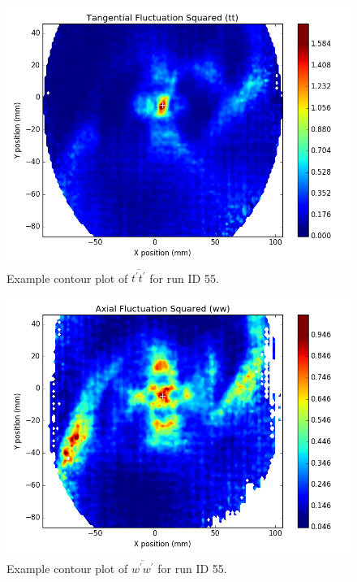 {\begin{figure}[H]
	\centering
	\includegraphics[width=5in]{figs/example_vortex_figs/example_tt_contour}
\caption{Example contour plot of $\overline{t^\prime t^\prime}$ for run ID 55.}
\label{fig:examp_tt}
\end{figure}

\begin{figure}[H]
	\centering
	\includegraphics[width=5in]{figs/example_vortex_figs/example_ww_contour}
\caption{Example contour plot of $\overline{w^\prime w^\prime}$ for run ID 55.}
\label{fig:examp_ww}
\end{figure}

}

